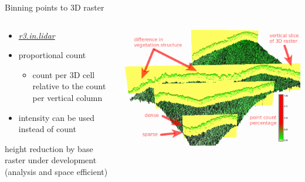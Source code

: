 \documentclass[xcolor={dvipsnames,usenames},beamer,aspectratio=169]{beamer}
\newcommand{\gmodule}[1]{\href{http://grass.osgeo.org/grass71/manuals/#1.html}{\emph{#1}}}
\begin{document}
\begin{frame}{Binning points to 3D raster}

\begin{columns}
\begin{column}{0.28\textwidth}

\begin{itemize}
  \item \gmodule{r3.in.lidar}
  \item proportional count
  \begin{itemize}
    \item count per 3D cell relative to the count per vertical column
  \end{itemize}
  \item intensity can be used instead of count
\end{itemize}

\bigskip
\footnotesize
height reduction by base raster under development
\tiny
(analysis and space efficient)

\end{column}
\begin{column}{0.7\textwidth}

\begin{center}
  \includegraphics[width=\textwidth]{grass/red_green_3d_labels}
\end{center}

\end{column}
\end{columns}

\end{frame}
\end{document}
